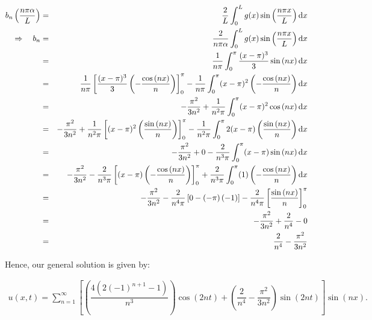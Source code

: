 \documentclass[11pt]{article}
\begin{document}
\begin{solution}
\begin{eqnarray*}
b_{n} \left( \dfrac{n\pi \alpha}{L} \right) & = & \dfrac{2}{L} \int_{0}^{L} g(x) \sin \left( \dfrac{n \pi x}{L} \right) {\rm d} x \\
\Rightarrow \quad b_{n}  & = & \dfrac{2}{n\pi \alpha} \int_{0}^{L} g(x) \sin \left( \dfrac{n \pi x}{L} \right) {\rm d} x \\
 & = & \dfrac{1}{n\pi} \int_{0}^{\pi} \dfrac{(x-\pi)^3}{3} \sin \left( n x \right) {\rm d} x \\
 & = & \dfrac{1}{n\pi} \left[ \dfrac{(x-\pi)^3}{3} \left( - \dfrac{\cos \left( n x \right)}{n} \right) \right]_{0}^{\pi} -  \dfrac{1}{n\pi} \int_{0}^{\pi} (x-\pi)^2 \left( - \dfrac{\cos \left( n x \right)}{n} \right) {\rm d} x \\
  & = & -\dfrac{\pi^2}{3n^2} + \dfrac{1}{n^2\pi} \int_{0}^{\pi} (x-\pi)^2 \cos \left( n x \right){\rm d} x \\
& = & -\dfrac{\pi^2}{3n^2} + \dfrac{1}{n^2\pi} \left[(x-\pi)^2 \left(  \dfrac{\sin \left( n x \right)}{n} \right) \right]_{0}^{\pi} - \dfrac{1}{n^2\pi} \int_{0}^{\pi} 2(x-\pi) \left(  \dfrac{\sin \left( n x \right)}{n} \right) {\rm d} x \\ 
& = & -\dfrac{\pi^2}{3n^2} +0 - \dfrac{2}{n^3\pi} \int_{0}^{\pi} (x-\pi) \sin \left( n x \right) {\rm d} x \\ 
& = & -\dfrac{\pi^2}{3n^2}  - \dfrac{2}{n^3\pi} \left[ (x-\pi)\left( - \dfrac{\cos \left( n x \right)}{n} \right) \right]_{0}^{\pi} + \dfrac{2}{n^3\pi}  \int_{0}^{\pi} (1) \left( - \dfrac{\cos \left( n x \right)}{n} \right) {\rm d} x \\ 
& = & -\dfrac{\pi^2}{3n^2}  - \dfrac{2}{n^4\pi} \left[ 0-(-\pi)\left( - 1 \right) \right] - \dfrac{2}{n^4\pi} \left[ \dfrac{\sin \left( n x \right)}{n}  \right ]_{0}^{\pi} \\
& = & -\dfrac{\pi^2}{3n^2} + \dfrac{2}{n^4} - 0 \\
& = & \dfrac{2}{n^4} -\dfrac{\pi^2}{3n^2}   \\
\end{eqnarray*}

Hence, our general solution is given by:

\begin{eqnarray*}
\boxed{u(x,t) = \sum_{n=1}^{\infty} \left[ \left(\dfrac{4( 2(-1)^{n+1} - 1)  }{n^3}  \right) \cos\left(2 n  t \right) +\left(\dfrac{2}{n^4} -\dfrac{\pi^2}{3n^2} \right) \sin\left(2 n  t \right) \right]  \sin\left( n x \right)}.
\end{eqnarray*}
\end{solution}
\end{document}
